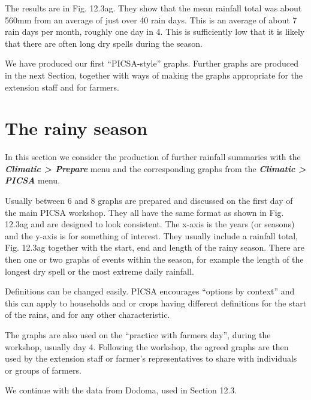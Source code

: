 \documentclass[
  letterpaper,
  DIV=11,
  numbers=noendperiod]{scrreprt}
\begin{document}
The results are in Fig. 12.3ag. They show that the mean rainfall total
was about 560mm from an average of just over 40 rain days. This is an
average of about 7 rain days per month, roughly one day in 4. This is
sufficiently low that it is likely that there are often long dry spells
during the season.

We have produced our first ``PICSA-style'' graphs. Further graphs are
produced in the next Section, together with ways of making the graphs
appropriate for the extension staff and for farmers.

\section{The rainy season}\label{the-rainy-season}

In this section we consider the production of further rainfall summaries
with the \textbf{\emph{Climatic \textgreater{} Prepare}} menu and the
corresponding graphs from the \textbf{\emph{Climatic \textgreater{}
PICSA}} menu.

Usually between 6 and 8 graphs are prepared and discussed on the first
day of the main PICSA workshop. They all have the same format as shown
in Fig. 12.3ag and are designed to look consistent. The x-axis is the
years (or seasons) and the y-axis is for something of interest. They
usually include a rainfall total, Fig. 12.3ag together with the start,
end and length of the rainy season. There are then one or two graphs of
events within the season, for example the length of the longest dry
spell or the most extreme daily rainfall.

Definitions can be changed easily. PICSA encourages ``options by
context'' and this can apply to households and or crops having different
definitions for the start of the rains, and for any other
characteristic.

The graphs are also used on the ``practice with farmers day'', during
the workshop, usually day 4. Following the workshop, the agreed graphs
are then used by the extension staff or farmer's representatives to
share with individuals or groups of farmers.

We continue with the data from Dodoma, used in Section 12.3.
\end{document}
